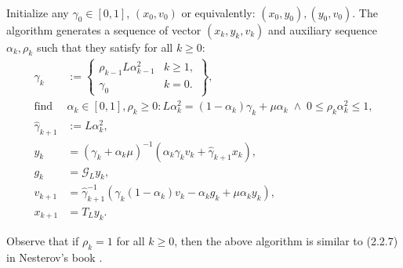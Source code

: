 \documentclass[12pt]{article}
\begin{document}
    \begin{definition}\label{def:wapg}
        \;\\
        Initialize any $\gamma_0 \in [0, 1]$, $(x_0, v_0)$ or equivalently: $(x_0, y_0), (y_0, v_0)$. 
        The algorithm generates a sequence of vector $(x_k, y_k, v_k)$ and auxiliary sequence $\alpha_k, \rho_k$ such that they satisfy for all $k\ge 0$: 
        $$
        \begin{aligned}
            \gamma_k &:= \left.\begin{cases}
                \rho_{k -1}L\alpha_{k - 1}^2 & k \ge 1,
                \\
                \gamma_0 & k = 0. 
            \end{cases}\right\rbrace,
            \\
            \text{find }&\alpha_k \in [0, 1], \rho_k \ge 0: L\alpha_k^2 = (1 - \alpha_k)\gamma_k + \mu \alpha_k  \;\wedge \; 0 \le \rho_k \alpha_k^2 \le 1, 
            \\
            \hat \gamma_{k + 1} &:= L\alpha_k^2, 
            \\
            y_k &= 
            (\gamma_k + \alpha_k \mu)^{-1}(\alpha_k \gamma_k v_k + \hat\gamma_{k + 1} x_k), 
            \\
            g_k &= \mathcal G_L y_k, 
            \\
            v_{k + 1} &= 
            \hat\gamma^{-1}_{k + 1}
            (\gamma_k(1 - \alpha_k) v_k - \alpha_k g_k + \mu \alpha_k y_k), 
            \\
            x_{k + 1} &= T_L y_k. 
        \end{aligned}
        $$
    \end{definition}
    \begin{observation}
        Observe that if $\rho_k = 1$ for all $k\ge 0$, then the above algorithm is similar to (2.2.7) in Nesterov's book \cite{nesterov_lectures_2018}. 
    \end{observation}
\end{document}

